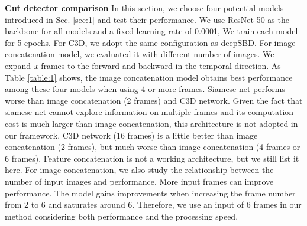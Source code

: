\documentclass[runningheads]{llncs}
\begin{document}
\textbf{Cut detector comparison} In this section, we choose four potential models introduced in Sec. \ref{sec:1} and test their performance. We use ResNet-50 as the backbone for all models and a fixed learning rate of 0.0001, We train each model for 5 epochs. For C3D, we adopt the same configuration as deepSBD. For image concatenation model, we evaluated it with different number of images. We expand \(\emph{x}\) frames to the forward and backward in the temporal direction. As Table \ref{table:1} shows, the image concatenation model obtains best performance among these four models when using 4 or more frames. Siamese net performs worse than image concatenation (2 frames) and C3D network. Given the fact that siamese net cannot explore information on multiple frames and its computation cost is much larger than image concatenation, this architecture is not adopted in our framework. C3D network (16 frames) is a little better than image concatenation (2 frames), but much worse than image concatenation (4 frames or 6 frames). Feature concatenation is not a working architecture, but we still list it here. For image concatenation, we also study the relationship between the number of input images and performance. More input frames can improve performance. The model gains improvements when increasing the frame number from 2 to 6 and saturates around 6. Therefore, we use an input of 6 frames in our method considering both performance and the processing speed. 
\end{document}
